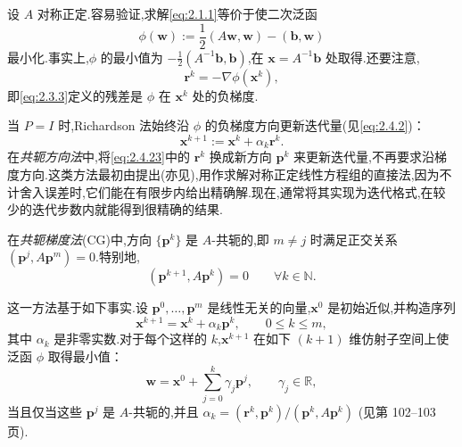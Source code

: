 设 \(A\) 对称正定.容易验证,求解\eqref{eq:2.1.1}等价于使二次泛函
\begin{equation}\label{eq:2.4.21}
  \phi(\boldsymbol{w}):=\frac12(A\boldsymbol{w},\boldsymbol{w})-(\boldsymbol{b},\boldsymbol{w})
\end{equation}
最小化.事实上,\(\phi\) 的最小值为 \(-\frac12(A^{-1}\boldsymbol{b},\boldsymbol{b})\),在 \(\boldsymbol{x}=A^{-1}\boldsymbol{b}\) 处取得.还要注意,
\begin{equation}\label{eq:2.4.22}
  \boldsymbol{r}^k=-\nabla\phi(\boldsymbol{x}^k),
\end{equation}
即\eqref{eq:2.3.3}定义的残差是 \(\phi\) 在 \(\boldsymbol{x}^k\) 处的负梯度.

当 \(P=I\) 时,Richardson 法始终沿 \(\phi\) 的负梯度方向更新迭代量(见\eqref{eq:2.4.2})：
\begin{equation}\label{eq:2.4.23}
  \boldsymbol{x}^{k+1}:=\boldsymbol{x}^k+\alpha_k\boldsymbol{r}^k.
\end{equation}
在\emph{共轭方向法}中,将\eqref{eq:2.4.23}中的 \(\boldsymbol{r}^k\) 换成新方向 \(\boldsymbol{p}^k\) 来更新迭代量,不再要求沿梯度方向.这类方法最初由提出(亦见),用作求解对称正定线性方程组的直接法,因为不计舍入误差时,它们能在有限步内给出精确解.现在,通常将其实现为迭代格式,在较少的迭代步数内就能得到很精确的结果.

在\emph{共轭梯度法}(CG)中,方向 \(\{\boldsymbol{p}^k\}\) 是 \(A\)-共轭的,即 \(m\ne j\) 时满足正交关系 \((\boldsymbol{p}^j,A\boldsymbol{p}^m)=0\).特别地,
\begin{equation}\label{eq:2.4.24}
  (\boldsymbol{p}^{k+1},A\boldsymbol{p}^k)=0\qquad \forall k\in\mathbb N.
\end{equation}

这一方法基于如下事实.设 \(\boldsymbol{p}^0,\ldots,\boldsymbol{p}^m\) 是线性无关的向量,\(\boldsymbol{x}^0\) 是初始近似,并构造序列
\[
  \boldsymbol{x}^{k+1}=\boldsymbol{x}^k+\alpha_k\boldsymbol{p}^k,\qquad 0\le k\le m,
\]
其中 \(\alpha_k\) 是非零实数.对于每个这样的 \(k\),\(\boldsymbol{x}^{k+1}\) 在如下 \((k+1)\) 维仿射子空间上使泛函 \(\phi\) 取得最小值：
\[
  \boldsymbol{w}=\boldsymbol{x}^0+\sum_{j=0}^k\gamma_j\boldsymbol{p}^j,\qquad \gamma_j\in\mathbb R,
\]
当且仅当这些 \(\boldsymbol{p}^j\) 是 \(A\)-共轭的,并且
\(\alpha_k=(\boldsymbol{r}^k,\boldsymbol{p}^k)/(\boldsymbol{p}^k,A\boldsymbol{p}^k)\)
(见第 102–103 页).

